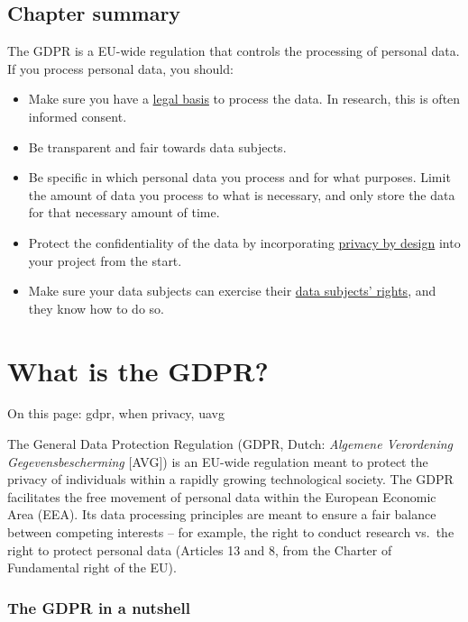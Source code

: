 \documentclass[
]{book}
\providecommand{\tightlist}{%
  \setlength{\itemsep}{0pt}\setlength{\parskip}{0pt}}
\begin{document}
\hypertarget{chapter-summary}{%
\subsection{Chapter summary}\label{chapter-summary}}

The GDPR is a EU-wide regulation that controls the processing of personal data.
If you process personal data, you should:

\begin{itemize}
\tightlist
\item
  Make sure you have a \protect\hyperlink{legal-basis}{legal basis} to process the
  data. In research, this is often informed consent.
\item
  Be transparent and fair towards data subjects.
\item
  Be specific in which personal data you process and for what purposes. Limit
  the amount of data you process to what is necessary, and only store the data
  for that necessary amount of time.
\item
  Protect the confidentiality of the data by incorporating
  \protect\hyperlink{privacy-by-design}{privacy by design} into your project from the start.
\item
  Make sure your data subjects can exercise their
  \protect\hyperlink{data-subject-rights}{data subjects' rights}, and they know how to do so.
\end{itemize}

\hypertarget{what-is-the-gdpr}{%
\section{What is the GDPR?}\label{what-is-the-gdpr}}

On this page: gdpr, when privacy, uavg

The General Data Protection Regulation (GDPR, Dutch: \emph{Algemene Verordening
Gegevensbescherming} {[}AVG{]}) is an EU-wide regulation meant to protect the privacy
of individuals within a rapidly growing technological society. The GDPR facilitates
the free movement of personal data within the European Economic Area (EEA). Its
data processing principles are meant to ensure a fair balance between competing
interests -- for example, the right to conduct research vs.~the right to protect
personal data (Articles 13 and 8, from the Charter of Fundamental right of the EU).

\hypertarget{the-gdpr-in-a-nutshell}{%
\subsubsection{The GDPR in a nutshell}\label{the-gdpr-in-a-nutshell}}
\end{document}
